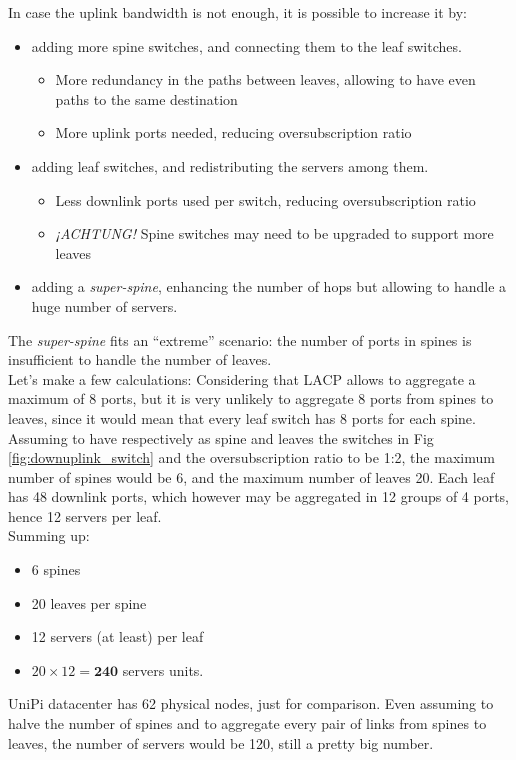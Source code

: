 In case the uplink bandwidth is not enough, it is possible to increase it by:
\begin{itemize}
   \item  adding more spine switches, and connecting them to the leaf switches.
   \begin{itemize}
      \item More redundancy in the paths between leaves, allowing to have even paths to the same destination
      \item More uplink ports needed, reducing oversubscription ratio
   \end{itemize}
   \item adding leaf switches, and redistributing the servers among them.
   \begin{itemize}
      \item Less downlink ports used per switch, reducing oversubscription ratio
      \item \textit{¡ACHTUNG!} Spine switches may need to be upgraded to support more leaves
   \end{itemize}
   \item adding a \textit{super-spine}, enhancing the number of hops but allowing to handle a huge number of servers.
\end{itemize}
The \textit{super-spine} fits an ``extreme'' scenario: the number of ports in spines is insufficient to handle the number of leaves.\\
Let's make a few calculations:
Considering that LACP allows to aggregate a maximum of 8 ports, but it is very unlikely to aggregate 8 ports from spines to leaves, since it would mean that every leaf switch has 8 ports for each spine.\\
Assuming to have respectively as spine and leaves the switches in Fig \ref{fig:downuplink_switch} and the oversubscription ratio to be 1:2, the maximum number of spines would be 6, and the maximum number of leaves 20.
Each leaf has 48 downlink ports, which however may be aggregated in 12 groups of 4 ports, hence 12 servers per leaf.\\
Summing up:
\begin{itemize}
   \item 6 spines
   \item 20 leaves per spine
   \item 12 servers (at least) per leaf
   \item $20 \times 12 = \textbf{240}$ servers units.
\end{itemize}
UniPi datacenter has 62 physical nodes, just for comparison.
Even assuming to halve the number of spines and to aggregate every pair of links from spines to leaves, the number of servers would be 120, still a pretty big number.

